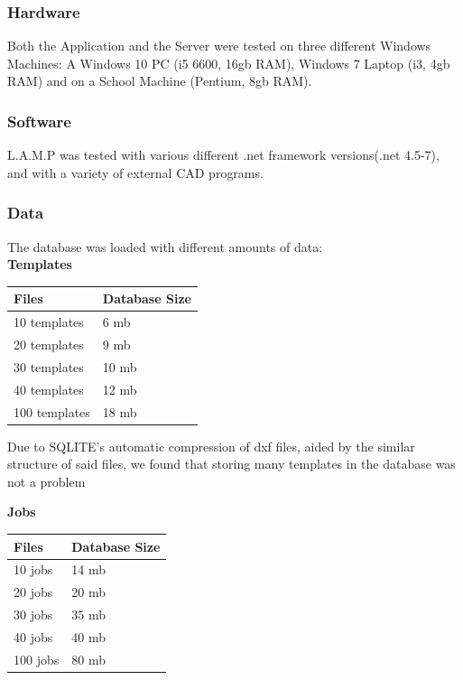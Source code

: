 \documentclass[oneside,openany,11pt,a4paper]{report}
\begin{document}
\subsubsection{Hardware}
Both the Application and the Server were tested on three different Windows Machines: A Windows 10 PC (i5 6600, 16gb RAM), Windows 7 Laptop (i3, 4gb RAM) and on a School Machine (Pentium, 8gb RAM).
\subsubsection{Software}
L.A.M.P was tested with various different .net framework versions(.net 4.5-7), and with a variety of external CAD programs.
\subsubsection{Data}
The database was loaded with different amounts of data:\\
\textbf{Templates}
\begin{longtable}{|p{5cm}|p{5cm}|}
	\hline
	\rowcolor{gray!50}
	\textbf{Files} & \textbf{Database Size}   \\ \hline

	10 templates & 6 mb  \\ \hline
	20 templates & 9 mb  \\ \hline
	30 templates & 10 mb  \\ \hline
	40 templates & 12 mb  \\ \hline
	100 templates & 18 mb  \\ \hline

\end{longtable}
Due to SQLITE's automatic compression of dxf files, aided by the similar structure of said files, we found that storing many templates in the database was not a problem

\textbf{Jobs}

\begin{longtable}{|p{5cm}|p{5cm}|}
	\hline
	\rowcolor{gray!50}
	\textbf{Files} & \textbf{Database Size}   \\ \hline
	
	10 jobs & 14 mb  \\ \hline
	20 jobs & 20 mb  \\ \hline
	30 jobs & 35 mb  \\ \hline
	40 jobs & 40 mb  \\ \hline
	100 jobs & 80 mb  \\ \hline
	
\end{longtable}
\end{document}
